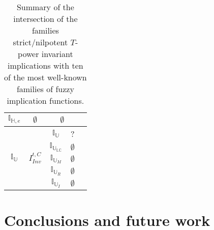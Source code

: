 \begin{table}[h]
\begin{tabular}{|c|Sc|cc|}
	$\mathbb{I}_{\mathbb{H},e}$             &         $\emptyset$          &             \\ \hline
	 &  &      & ?   \\  
	&                   &  & $\emptyset$   \\  
	&                   &     &  $\emptyset$  \\  
	&                   &     &  $\emptyset$  \\  
	&                   &    & $\emptyset$   \\ \hline
\end{tabular}
\caption{Summary of the intersection of the families strict/nilpotent $T$-power invariant implications with ten of the most well-known families of fuzzy implication functions.}\label{table:tpowerinvariantintersections}
\end{table}

\section{Conclusions and future work}\label{section:ConclusionsTpowerInvariant}

